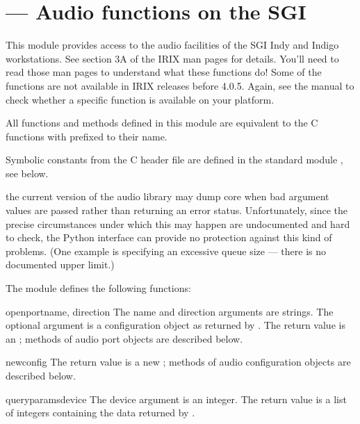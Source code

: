 \section{ ---
         Audio functions on the SGI}



This module provides access to the audio facilities of the SGI Indy
and Indigo workstations.  See section 3A of the IRIX man pages for
details.  You'll need to read those man pages to understand what these
functions do!  Some of the functions are not available in IRIX
releases before 4.0.5.  Again, see the manual to check whether a
specific function is available on your platform.

All functions and methods defined in this module are equivalent to
the C functions with  prefixed to their name.

Symbolic constants from the C header file  are
defined in the standard module , see
below.

 the current version of the audio library may dump core
when bad argument values are passed rather than returning an error
status.  Unfortunately, since the precise circumstances under which
this may happen are undocumented and hard to check, the Python
interface can provide no protection against this kind of problems.
(One example is specifying an excessive queue size --- there is no
documented upper limit.)

The module defines the following functions:


\begin{funcdesc}{openport}{name, direction}
The name and direction arguments are strings.  The optional
 argument is a configuration object as returned by
.  The return value is an ; methods of audio port objects are described below.
\end{funcdesc}

\begin{funcdesc}{newconfig}{}
The return value is a new ; methods of
audio configuration objects are described below.
\end{funcdesc}

\begin{funcdesc}{queryparams}{device}
The device argument is an integer.  The return value is a list of
integers containing the data returned by .
\end{funcdesc}

